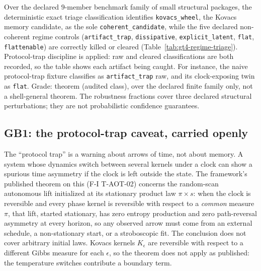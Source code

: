 Over the declared $9$-member benchmark family of small structural packages, the deterministic
exact triage classification identifies \texttt{kovacs\_wheel}, the Kovacs memory candidate, as
the sole \texttt{coherent\_candidate}, while the five declared non-coherent regime controls
(\texttt{artifact\_trap}, \texttt{dissipative}, \texttt{explicit\_latent}, \texttt{flat},
\texttt{flattenable}) are correctly killed or cleared (Table~\ref{tab:gt4-regime-triage}).
Protocol-trap discipline is applied: raw and cleared classifications are both recorded, so the
table shows each artifact being caught. For instance, the naive protocol-trap fixture classifies
as \texttt{artifact\_trap} raw, and its clock-exposing twin as \texttt{flat}. Grade: theorem
(audited class), over the declared finite family only, not a shell-general theorem. The
robustness fractions cover three declared structural perturbations; they are not probabilistic
confidence guarantees.



\subsection{GB1: the protocol-trap caveat, carried openly}

The ``protocol trap'' is a warning about arrows of time, not about memory. A system whose dynamics
switch between several kernels under a clock can show a spurious time asymmetry if the clock is
left outside the state. The framework's published theorem on this (F-I T-AOT-02) concerns the
random-scan autonomous lift initialized at its stationary product law $\pi\times s$: when the
clock is reversible and every phase kernel is reversible with respect to a \emph{common}
measure $\pi$, that lift, started stationary, has zero entropy production and zero
path-reversal asymmetry at every horizon, so any observed arrow must come from an external schedule, a non-stationary
start, or a stroboscopic fit. The conclusion does not cover arbitrary initial laws. Kovacs kernels $K_\epsilon$ are reversible with respect to a different Gibbs
measure for each $\epsilon$, so the theorem does not apply as published: the temperature switches
contribute a boundary term.

